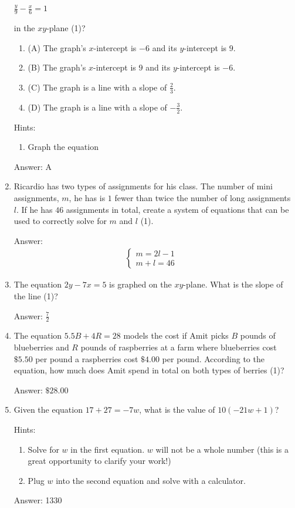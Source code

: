 \documentclass{article}
\begin{document}
\begin{enumerate}
{	      \(
	      \frac{y}{9} - \frac{x}{6} = 1
	      \)

	      in the $xy$-plane (1)?


	      \begin{enumerate}
		      \item (A) The graph's \(x\)-intercept is \(-6\) and its \(y\)-intercept is \(9\).
		      \item (B) The graph's \(x\)-intercept is \(9\) and its \(y\)-intercept is \(-6\).
		      \item (C) The graph is a line with a slope of \(\frac{2}{3}\).
		      \item (D) The graph is a line with a slope of \(-\frac{3}{2}\).
	      \end{enumerate}

	      Hints:
	      \begin{enumerate}
		      \item{Graph the equation}
	      \end{enumerate}

	      Answer: A
	      }
	\item {
	      Ricardio has two types of assignments for his class. The number of mini assignments, $m$, he has is $1$ fewer than twice the number of long assignments $l$. If he has $46$ assignments in total, create a system of equations that can be used to correctly solve for $m$ and $l$ (1).

	      Answer:
	      \[
		      \begin{array}{l}
			      \begin{cases}
				      m=2l-1 & \\
				      m+l=46
			      \end{cases}
		      \end{array}
	      \]
	      }
	\item {The equation \(2y-7x=5\) is graphed on the $xy$-plane. What is the slope of the line (1)?

	      Answer: \(\frac{7}{2}\)}
	\item {The equation \(5.5B+4R=28\) models the cost if Amit picks $B$ pounds of blueberries and $R$ pounds of raspberries at a farm where blueberries cost $\$5.50$ per pound a raspberries cost $\$4.00$ per pound. According to the equation, how much does Amit spend in total on both types of berries (1)?

		      Answer: $\$28.00$}

	\item {Given the equation \(17+27=-7w\), what is the value of \(10(-21w+1)\)?

	      Hints:
	      \begin{enumerate}
		      \item {Solve for $w$ in the first equation. $w$ will not be a whole number (this is a great opportunity to clarify your work!)}
		      \item {Plug $w$ into the second equation and solve with a calculator.}
	      \end{enumerate}

	      Answer: 1330}


\end{enumerate}
\end{document}
